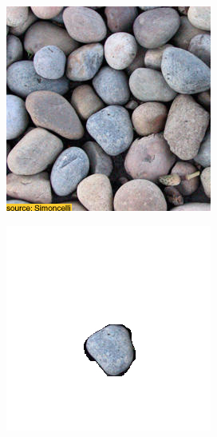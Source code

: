 \begin{figure}[]
\begin{subfigure}{\textwidth}
        \begin{subfigure}{0.24\textwidth}
            \centering
            \includegraphics[width=\textwidth]{images/04-experiment01/pebbles/target.jpg}
        \end{subfigure}
        \hfill
        \begin{subfigure}{0.24\textwidth}
            \centering
            \includegraphics[width=\textwidth]{images/04-experiment01/pebbles/one_bg.jpg}

\end{subfigure}
\end{subfigure}
\end{figure}
